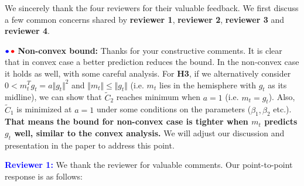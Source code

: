 \documentclass{article}
\begin{document}
We sincerely thank the four reviewers for their valuable feedback. 
We first discuss a few common concerns shared by \textbf{\color{blue}reviewer 1}, \textbf{\color{red} reviewer 2}, \textbf{\color{green!50!black}reviewer 3} and \textbf{\color{purple}reviewer 4}. \vspace{-5pt}

${\color{blue}\bullet}\!~{\color{red}\bullet}$ \textbf{Non-convex bound:} 
Thanks for your constructive comments. It is clear that in convex case a better prediction reduces the bound. In the non-convex case it holds as well, with some careful analysis. For \textbf{H3}, if we alternatively consider $0<m_t^T g_t=a\Vert g_t\Vert^2$ and $\Vert m_t\Vert\leq \Vert g_t\Vert$ (i.e. $m_t$ lies in the hemisphere with $g_t$ as its midline), we can show that $\tilde C_2$ reaches minimum when $a=1$ (i.e. $m_t=g_t$). Also, $\tilde C_1$ is minimized at $a=1$ under some conditions on the parameters ($\beta_1,\beta_2$ etc.). \textbf{That means the bound for non-convex case is tighter when $m_t$ predicts $g_t$ well, similar to the convex analysis.} We will adjust our discussion and presentation in the paper to address this point. \vspace{-5pt}


\vspace{0.05in}

\textbf{\textcolor{blue}{Reviewer 1:}} We thank the reviewer for valuable comments. Our point-to-point response is as follows:\vspace{-5pt}
\end{document}
